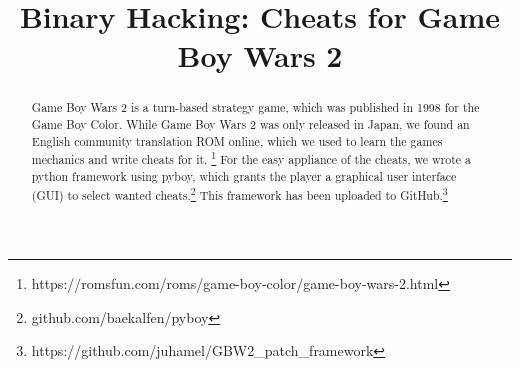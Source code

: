 \documentclass[conference,dvipsnames]{IEEEtran}
\begin{document}
\title{Binary Hacking: Cheats for Game Boy Wars 2}

\author{
}

\maketitle

\begin{abstract}
	Game Boy Wars 2 is a turn-based strategy game, which was published in 1998 for the Game Boy Color.
	While Game Boy Wars 2 was only released in Japan, we found an English community translation ROM online, which we used to learn the games mechanics and write cheats for it. \footnote{https://romsfun.com/roms/game-boy-color/game-boy-wars-2.html}
	For the easy appliance of the cheats, we wrote a python framework using pyboy, which grants the player a graphical user interface (GUI) to select wanted cheats.\footnote{github.com/baekalfen/pyboy}
	This framework has been uploaded to GitHub.\footnote{https://github.com/juhamel/GBW2\_patch\_framework}
\end{abstract}






\clearpage
%
\end{document}
